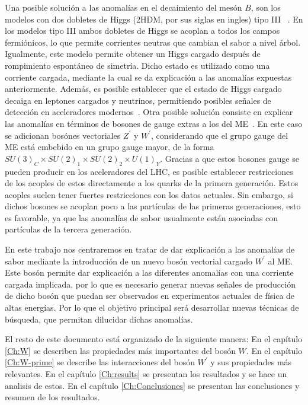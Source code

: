 Una posible solución a las anomalías en el decaimiento del mesón $B$, son los modelos con dos dobletes de Higgs (2HDM, por sus siglas en ingles) tipo III  ~\cite{Chen:2017eby,Iguro:2017ysu}. En los modelos tipo III ambos dobletes de Higgs se acoplan a todos los campos fermiónicos, lo que permite corrientes neutras que cambian el sabor a nivel árbol. Igualmente, este modelo permite obtener un Higgs cargado después de rompimiento espontáneo de simetría. Dicho estado es utilizado como una corriente cargada, mediante la cual se da explicación a las anomalías expuestas anteriormente. Además, es posible establecer que el estado de Higgs cargado decaiga en leptones cargados y neutrinos, permitiendo posibles señales de detección en aceleradores modernos~\cite{AristizabalSierra:2006ri}.
Otra posible solución consiste en explicar las anomalías en términos de bosones de gauge extras a los del ME~\cite{Boucenna:2016wpr}. En este caso se adicionan bosónes vectoriales $Z^{\prime}$ y $W^{\prime}$, considerando que el grupo gauge del ME está embebido en un grupo gauge mayor, de la forma $SU(3)_C \times SU(2)_1 \times SU(2)_2 \times U(1)_Y$. Gracias a que estos bosones gauge se pueden producir en los aceleradores del LHC, es posible establecer restricciones de los acoples de estos directamente a los quarks de la primera generación. Estos acoples suelen tener fuertes restricciones con los datos actuales. Sin embargo, si dichos bosones se acoplan poco a las partículas de las primeras generaciones, esto es favorable, ya que las anomalías de sabor usualmente están asociadas con partículas de la tercera generación.

En este trabajo nos centraremos en tratar de dar explicación a las anomalías de sabor mediante la introducción de un nuevo bosón vectorial cargado $W^{\prime}$ al ME. Este bosón permite dar explicación a las diferentes anomalías con una corriente cargada implicada, por lo que es necesario generar nuevas señales de producción de  dicho bosón que puedan ser observados en experimentos actuales de física de altas energías. Por lo que el objetivo principal será desarrollar nuevas técnicas de búsqueda, que permitan dilucidar dichas anomalías. 

El resto de este documento está organizado de la siguiente manera: En el capítulo \ref{Ch:W} se describen las propiedades más importantes del bosón $W$. En el capítulo \ref{Ch:W-prime} se describe las interacciones del bosón $W^{\prime}$ y sus propiedades más relevantes. En el capítulo \ref{Ch:results} se presentan los resultados y se hace un analisis de estos. En el capítulo \ref{Ch:Conclusiones} se presentan las conclusiones y resumen de los resultados.
